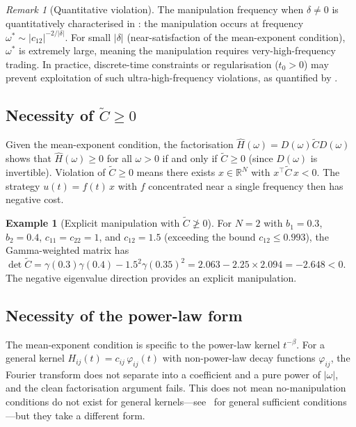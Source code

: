 \documentclass[12pt]{article}
\theoremstyle{definition}
\newtheorem{example}[theorem]{Example}
\theoremstyle{remark}
\newtheorem{remark}[theorem]{Remark}
\newcommand{\R}{\mathbb{R}}
\newcommand{\bC}{\widetilde{C}}
\begin{document}
\begin{remark}[Quantitative violation]\label{rem:quantitative}
The manipulation frequency when $\delta\neq 0$ is quantitatively characterised
in : the manipulation occurs at frequency
$\omega^* \sim |c_{12}|^{-2/|\delta|}$.  For small $|\delta|$ (near-satisfaction
of the mean-exponent condition), $\omega^*$ is extremely large, meaning the
manipulation requires very-high-frequency trading.  In practice, discrete-time
constraints or regularisation ($t_0>0$) may prevent exploitation of such
ultra-high-frequency violations, as quantified by .
\end{remark}

\subsection{Necessity of \texorpdfstring{$\bC\ge 0$}{C-tilde >= 0}}\label{sec:Ctilde_necessity}

Given the mean-exponent condition, the factorisation $\widehat{H}(\omega) = D(\omega)\bC D(\omega)$
shows that $\widehat{H}(\omega)\ge 0$ for all $\omega > 0$ if and only if $\bC\ge 0$
(since $D(\omega)$ is invertible).  Violation of $\bC\ge 0$ means there exists
$x\in\R^N$ with $x^\top\bC\,x < 0$.  The strategy
$u(t) = f(t)\,x$ with $f$ concentrated near a single frequency then has negative cost.

\begin{example}[Explicit manipulation with $\bC\not\ge 0$]\label{ex:Ctilde_viol}
For $N=2$ with $b_1=0.3$, $b_2=0.4$, $c_{11}=c_{22}=1$, and $c_{12}=1.5$
(exceeding the bound $c_{12}\le 0.993$), the Gamma-weighted matrix has
$\det\bC = \gamma(0.3)\gamma(0.4) - 1.5^2\gamma(0.35)^2
= 2.063 - 2.25\times 2.094 = -2.648 < 0$.
The negative eigenvalue direction provides an explicit manipulation.
\end{example}

\subsection{Necessity of the power-law form}

The mean-exponent condition is specific to the power-law kernel $t^{-\beta}$.
For a general kernel $H_{ij}(t) = c_{ij}\,\varphi_{ij}(t)$ with non-power-law
decay functions $\varphi_{ij}$, the Fourier transform does not separate into
a coefficient and a pure power of $|\omega|$, and the clean factorisation
argument fails.  This does not mean no-manipulation conditions do not exist
for general kernels---see~\cite{AbiJaberNeumanTuschmann2026} for general
sufficient conditions---but they take a different form.
\end{document}
